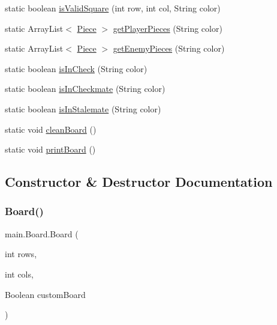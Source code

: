 \begin{DoxyCompactItemize}
\item 
static boolean \hyperlink{classmain_1_1_board_a9e7b3d4970ecf07f4d41862a5dd2c23c}{is\+Valid\+Square} (int row, int col, String color)
\item 
static Array\+List$<$ \hyperlink{classmain_1_1pieces_1_1_piece}{Piece} $>$ \hyperlink{classmain_1_1_board_a95214b4080e976b2db615c57fb9dbfaa}{get\+Player\+Pieces} (String color)
\item 
static Array\+List$<$ \hyperlink{classmain_1_1pieces_1_1_piece}{Piece} $>$ \hyperlink{classmain_1_1_board_a0e831a72f6f1cbf863dc42b9cd4a6de3}{get\+Enemy\+Pieces} (String color)
\item 
static boolean \hyperlink{classmain_1_1_board_acc973c8cc2e9c539fed65bfc3eed5e8f}{is\+In\+Check} (String color)
\item 
static boolean \hyperlink{classmain_1_1_board_a7d699e1aaf245c0fab5b1dde84b81d04}{is\+In\+Checkmate} (String color)
\item 
static boolean \hyperlink{classmain_1_1_board_a415002f647006cb115dbf0e497d526f9}{is\+In\+Stalemate} (String color)
\item 
static void \hyperlink{classmain_1_1_board_a47fe4923194507b37829c4c0169e9e62}{clean\+Board} ()
\item 
static void \hyperlink{classmain_1_1_board_a8827dbdb62886f10405270f28de92c71}{print\+Board} ()
\end{DoxyCompactItemize}


\subsection{Constructor \& Destructor Documentation}
\mbox{\label{classmain_1_1_board_a8121213fe895c9aef3b825f9981ab014}} 
\subsubsection{\texorpdfstring{Board()}{Board()}}
{\footnotesize\ttfamily main.\+Board.\+Board (\begin{DoxyParamCaption}\item[{int}]{rows,  }\item[{int}]{cols,  }\item[{Boolean}]{custom\+Board }\end{DoxyParamCaption})\hspace{0.3cm}{\ttfamily [inline]}}

